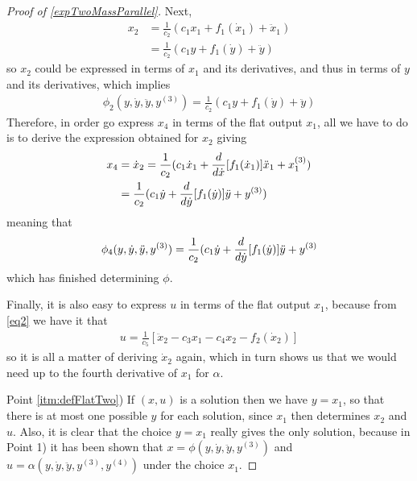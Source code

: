 \documentclass[12pt]{article}
\begin{document}
\begin{proof}[ Proof of \ref{expTwoMassParallel}]
  Next,
  \begin{equation}\begin{aligned} \label{eq1}
    x_2 &= \frac{1}{c_2} ( c_1 x_1 + f_1(\dot{x}_1) + \ddot{x}_1 ) \\
    &=  \frac{1}{c_2} ( c_1 y + f_1(\dot{y}) + \ddot{y} )
  \end{aligned}\end{equation}
  so $x_2$ could be expressed in terms of $x_1$ and its derivatives, and thus in 
  terms of $y$ and its derivatives, which implies
  \begin{equation}\begin{aligned}
    \phi_2(y, \dot{y}, \ddot{y}, y^{(3)}) =  \frac{1}{c_2} ( c_1 y + f_1(\dot{y}) + \ddot{y})
  \end{aligned}\end{equation}
  Therefore, in order go express $x_4$ in terms of the flat output $x_1$, all we have to do is to derive the expression obtained for $x_2$ giving
  \begin{equation}\begin{aligned}
    x_4
    &= \dot{x}_2
    = \frac{1}{c_2} ( c_1 \dot{x}_1 + \frac{d}{d\dot{x}} [f_1(\dot{x}_1)]\ddot{x}_1 + x_1^{(3)} ) \\
    &= \frac{1}{c_2} ( c_1 \dot{y} + \frac{d}{d\dot{y}} [f_1(\dot{y})]\ddot{y} + y^{(3)} )
  \end{aligned}\end{equation}
  meaning that
  \begin{equation}\begin{aligned}
    \phi_4(y, \dot{y}, \ddot{y}, y^{(3)}) = \frac{1}{c_2} ( c_1 \dot{y} + \frac{d}{d\dot{y}} [f_1(\dot{y})]\ddot{y} + y^{(3)}
  \end{aligned}\end{equation}
  which has finished determining $\phi$.
  
  Finally, it is also easy to express $u$ in terms of the flat output $x_1$, because
  from \eqref{eq2} we have it that
  \begin{equation}\begin{aligned}
    u = \frac{1}{c_5}[ \ddot{x}_2 - c_3 x_1 - c_4 x_2 - f_2(\dot{x}_2) ]
  \end{aligned}\end{equation}
  so it is all a matter of deriving $\dot{x}_2$ again, which in turn shows us that
  we would need up to the fourth derivative of $x_1$ for $\alpha$.
  
  Point \ref{itm:defFlatTwo}) If $(x,u)$ is a solution then we have $y = x_1$, so
  that there is at most one possible $y$ for each solution, since $x_1$ then
  determines $x_2$ and $u$.
  Also, it is clear that the choice $y=x_1$ really gives the only solution, because
  in Point 1) it has been shown that $x=\phi(y,\dot{y},\ddot{y},y^{(3)})$ and
  $u=\alpha(y,\dot{y},\ddot{y},y^{(3)},y^{(4)})$ under the choice $x_1$.
\end{proof}
\end{document}

